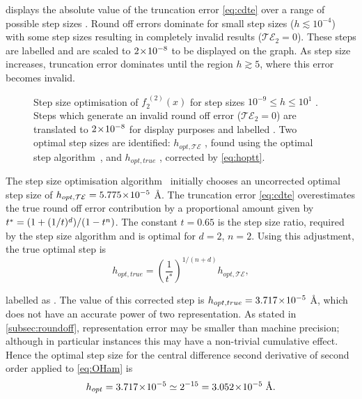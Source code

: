  displays the absolute value of the truncation error \cref{eq:cdte} over a range of possible step sizes .
Round off errors dominate for small step sizes ($h \lesssim 10^{-4}$) with some step sizes resulting in completely invalid results (\ie $\mathcal{TE}_2 = 0$).
These steps are labelled  and are scaled to $2\!\times\!10^{-8}$ to be displayed on the graph.
As step size increases, truncation error dominates until the region $h \gtrsim 5$, where this error becomes invalid.
\begin{figure}[htp]
\centering
\resizebox{\columnwidth}{!}{}
\caption[Step size optimisation of $f_2^{\;(2)}(x)$]{\label{fig:hopt3pt}Step size optimisation of $f_2^{\;(2)}(x)$ for step sizes $10^{-9}\!\leq\! h\! \leq\! 10^1$ . Steps which generate an invalid round off error (\ie $\mathcal{TE}_2 = 0$) are translated to $2\!\times\!10^{-8}$ for display purposes and labelled . Two optimal step sizes are identified: $h_{opt,\mathcal{TE}}$ , found using the optimal step algorithm~\cite{Mathur2012}, and $h_{opt,true}$ , corrected by \cref{eq:hoptt}.}
\end{figure}

The step size optimisation algorithm~\cite{Mathur2012} initially chooses an uncorrected optimal step size  of $h_{opt,\mathcal{TE}} = 5.775\!\times\!10^{-5}$ Å.
The truncation error \cref{eq:cdte} overestimates the true round off error contribution by a proportional amount given by $\cramped{t^* = (1+(1/t)^d)/(1-t^n)}$.
The constant $t = 0.65$ is the step size ratio, required by the step size algorithm and is optimal for $d=2$, $n=2$.
Using this adjustment, the true optimal step is
\begin{equation}
h_{opt,true} = \left(\frac{1}{t^*}\right)^{1/(n+d)}h_{opt,\mathcal{TE}},\label{eq:hoptt}
\end{equation}

labelled as .
The value of this corrected step is $h_{opt,true} = 3.717\!\times\!10^{-5}$ Å, which does not have an accurate power of two representation.
As stated in \cref{subsec:roundoff}, representation error may be smaller than machine precision; although in particular instances this may have a non-trivial cumulative effect.
Hence the optimal step size for the central difference second derivative of second order applied to \cref{eq:OHam} is
\begin{equation}
h_{opt} = 3.717\!\times\!10^{-5} \simeq 2^{-15} = 3.052\!\times\!10^{-5}\;\text{Å}.
\end{equation}

